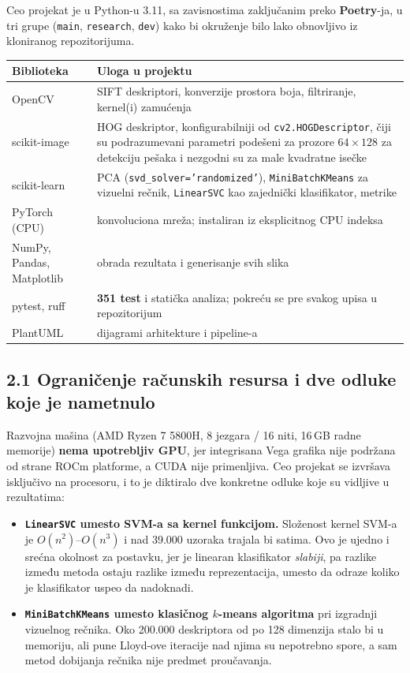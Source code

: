 \documentclass[11pt,a4paper]{article}
\begin{document}
Ceo projekat je u Python-u 3.11, sa zavisnostima zaključanim preko \textbf{Poetry}-ja, u tri
grupe (\texttt{main}, \texttt{research}, \texttt{dev}) kako bi okruženje bilo lako obnovljivo iz kloniranog repozitorijuma.

\begin{center}
\begin{tabular}{|>{\raggedright\arraybackslash}p{3.6cm}|>{\raggedright\arraybackslash}p{12.2cm}|}
\hline
\textbf{Biblioteka} & \textbf{Uloga u projektu} \\
\hline
OpenCV & SIFT deskriptori, konverzije prostora boja, filtriranje, kernel(i) zamućenja \\
\hline
scikit-image & HOG deskriptor, konfigurabilniji od \texttt{cv2.HOGDescriptor}, čiji su podrazumevani parametri podešeni za prozore $64\times128$ za detekciju pešaka i nezgodni su za male kvadratne isečke \\
\hline
scikit-learn & PCA (\texttt{svd\_solver='randomized'}), \texttt{MiniBatchKMeans} za vizuelni rečnik, \texttt{LinearSVC} kao zajednički klasifikator, metrike \\
\hline
PyTorch (CPU) & konvoluciona mreža; instaliran iz eksplicitnog CPU indeksa \\
\hline
NumPy, Pandas, Matplotlib & obrada rezultata i generisanje svih slika \\
\hline
pytest, ruff & \textbf{351 test} i statička analiza; pokreću se pre svakog upisa u repozitorijum \\
\hline
PlantUML & dijagrami arhitekture i pipeline-a \\
\hline
\end{tabular}
\end{center}

\subsection*{2.1 Ograničenje računskih resursa i dve odluke koje je nametnulo}

Razvojna mašina (AMD Ryzen 7 5800H, 8 jezgara / 16 niti, 16\,GB radne memorije) \textbf{nema
upotrebljiv GPU}, jer integrisana Vega grafika nije podržana od strane ROCm platforme, a CUDA
nije primenljiva. Ceo projekat se izvršava isključivo na procesoru, i to je diktiralo dve konkretne odluke koje su vidljive u rezultatima:

\begin{itemize}
  \item \textbf{\texttt{LinearSVC} umesto SVM-a sa kernel funkcijom.} Složenost kernel SVM-a je
  $O(n^2)$--$O(n^3)$ i nad 39.000 uzoraka trajala bi satima. Ovo je ujedno i srećna okolnost za
  postavku, jer je linearan klasifikator \emph{slabiji}, pa razlike između metoda ostaju razlike
  između reprezentacija, umesto da odraze koliko je klasifikator uspeo da nadoknadi.
  \item \textbf{\texttt{MiniBatchKMeans} umesto klasičnog $k$-means algoritma} pri izgradnji
  vizuelnog rečnika. Oko 200.000 deskriptora od po 128 dimenzija stalo bi u memoriju, ali pune
  Lloyd-ove iteracije nad njima su nepotrebno spore, a sam metod dobijanja rečnika	 nije predmet proučavanja.
\end{itemize}
\end{document}

